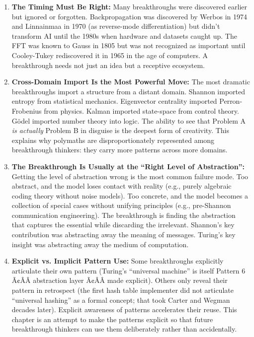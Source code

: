 \begin{enumerate}
\item \textbf{The Timing Must Be Right:} Many breakthroughs were discovered earlier but ignored or forgotten. Backpropagation was discovered by Werbos in 1974 and Linnainmaa in 1970 (as reverse-mode differentiation) but didn't transform AI until the 1980s when hardware and datasets caught up. The FFT was known to Gauss in 1805 but was not recognized as important until Cooley-Tukey rediscovered it in 1965 in the age of computers. A breakthrough needs not just an idea but a receptive ecosystem.

\item \textbf{Cross-Domain Import Is the Most Powerful Move:} The most dramatic breakthroughs import a structure from a distant domain. Shannon imported entropy from statistical mechanics. Eigenvector centrality imported Perron-Frobenius from physics. Kalman imported state-space from control theory. G\"odel imported number theory into logic. The ability to see that Problem A \emph{is actually} Problem B in disguise is the deepest form of creativity. This explains why polymaths are disproportionately represented among breakthrough thinkers: they carry more patterns across more domains.

\item \textbf{The Breakthrough Is Usually at the ``Right Level of Abstraction'':} Getting the level of abstraction wrong is the most common failure mode. Too abstract, and the model loses contact with reality (e.g., purely algebraic coding theory without noise models). Too concrete, and the model becomes a collection of special cases without unifying principles (e.g., pre-Shannon communication engineering). The breakthrough is finding the abstraction that captures the essential while discarding the irrelevant. Shannon's key contribution was abstracting away the meaning of messages. Turing's key insight was abstracting away the medium of computation.

\item \textbf{Explicit vs. Implicit Pattern Use:} Some breakthroughs explicitly articulate their own pattern (Turing's ``universal machine'' is itself Pattern 6 Ã¢ÂÂ abstraction layer Ã¢ÂÂ made explicit). Others only reveal their pattern in retrospect (the first hash table implementer did not articulate ``universal hashing'' as a formal concept; that took Carter and Wegman decades later). Explicit awareness of patterns accelerates their reuse. This chapter is an attempt to make the patterns explicit so that future breakthrough thinkers can use them deliberately rather than accidentally.


\end{enumerate}
